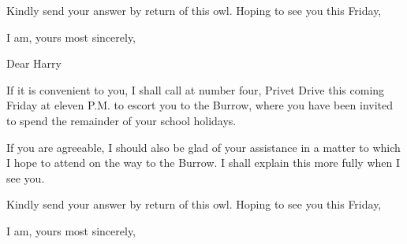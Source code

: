 \documentclass[11pt]{IFSCommunication}
\begin{document}
Kindly send your answer by return of this owl. Hoping to see you this Friday,

\closing[t]{I am, yours most sincerely,}

\clearpage







Dear Harry

If it is convenient to you, I shall call at number four, Privet Drive this coming Friday at eleven P.M. to escort you to the Burrow, where you have been invited to spend the remainder of your school holidays.

If you are agreeable, I should also be glad of your assistance in a matter to which I hope to attend on the way to the Burrow. I shall explain this more fully when I see you.

Kindly send your answer by return of this owl. Hoping to see you this Friday,

\closing[t]{I am, yours most sincerely,}

\clearpage


\end{document}
